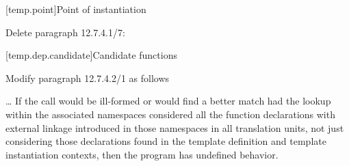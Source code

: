 [temp.point]{Point of instantiation}

\noindent
Delete paragraph 12.7.4.1/7:
\begin{std.txt}
\resetalinea[6]
\alinea
{}
\end{std.txt}

[temp.dep.candidate]{Candidate functions}

\noindent
Modify paragraph 12.7.4.2/1 as follows
\begin{std.txt}
\resetalinea[0]
\alinea
\ldots
If the call would be ill-formed or would find a better match had the 
lookup within the associated namespaces considered all the function 
declarations with external   
linkage introduced in those namespaces in all
translation units, not just considering those declarations found in the 
template definition and template instantiation contexts, then the program 
has undefined behavior.
\end{std.txt}



